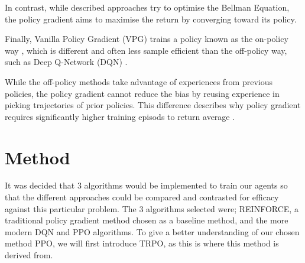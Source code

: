 \documentclass{article}
\begin{document}
In contrast, while described approaches try to optimise the Bellman Equation, the policy gradient aims to maximise the return by converging toward its policy.

Finally, Vanilla Policy Gradient (VPG) trains a policy known as the on-policy way \citep{peters2006policy}, which is different and often less sample efficient than the off-policy way, such as Deep Q-Network (DQN) \citep{dqn}.

While the off-policy methods take advantage of experiences from previous policies, the policy gradient cannot reduce the bias by reusing experience in picking trajectories of prior policies. This difference describes why policy gradient requires significantly higher training episods to return average \citep{Gadgil2020}.

\section{Method}
It was decided that 3 algorithms would be implemented to train our agents so that the different approaches could be compared and contrasted for efficacy against this particular problem. The 3 algorithms selected were; REINFORCE, a traditional policy gradient method chosen as a baseline method, and the more modern DQN and PPO algorithms. To give a better understanding of our chosen method PPO, we will first introduce TRPO, as this is where this method is derived from. 
\end{document}
